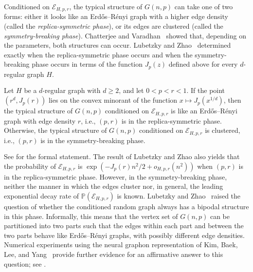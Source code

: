 Conditioned on $\mathcal E_{H,p,r}$, the typical structure of $G(n,p)$ can take one of two forms: either it looks like an Erd\H{o}s--R\'enyi graph with a higher edge density (called the \emph{replica-symmetric phase}), or its edges are clustered (called the \emph{symmetry-breaking phase}).
Chatterjee and Varadhan~\cite{ChatterjeeVaradhanLDP} showed that, depending on the parameters, both structures can occur.
Lubetzky and Zhao~\cite{lubetzky2015large} determined exactly when the replica-symmetric phase occurs and when the symmetry-breaking phase occurs in terms of the function $J_p(z)$ defined above for every $d$-regular graph $H$.
\begin{theorem}\label{thm:lz-criterion-informal}
  Let $H$ be a $d$-regular graph with $d \geq 2$, and let $0<p<r<1$. If the point $(r^d, J_p(r))$ lies on the convex minorant of the function $x\mapsto J_p(x^{1/d})$, then the typical structure of $G(n,p)$ conditioned on $\mathcal E_{H,p,r}$ is like an Erd\H{o}s--R\'enyi graph with edge density $r$, i.e., $(p, r)$ is in the replica-symmetric phase. Otherwise, the typical structure of $G(n,p)$ conditioned on $\mathcal E_{H,p,r}$ is clustered, i.e., $(p, r)$ is in the symmetry-breaking phase.
\end{theorem}
See  for the formal statement.
The result of Lubetzky and Zhao also yields that the probability of $\mathcal E_{H,p,r}$ is $\exp(-J_p(r)n^2/2 + o_{H,p,r}(n^2))$ when $(p, r)$ is in the replica-symmetric phase.
However, in the symmetry-breaking phase, neither the manner in which the
edges cluster nor, in general, the leading exponential decay rate of
$\mathbb P(\mathcal E_{H,p,r})$ is known.
Lubetzky and Zhao~\cite[Section~7]{lubetzky2015large} raised the question of
whether the conditioned random graph always has a bipodal structure in this
phase.  Informally, this means that the vertex set of $G(n,p)$ can be partitioned
into two parts such that the edges within each part and between the two parts
behave like Erd\H{o}s--R\'enyi graphs, with possibly different edge densities.  Numerical experiments using the
neural graphon representation of Kim, Baek, Lee, and
Yang~\cite{KimBaekLeeYangGraphons} provide further evidence for an
affirmative answer to this question; see .

